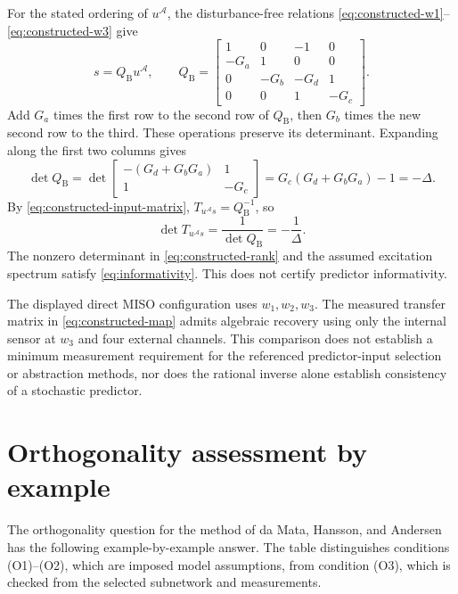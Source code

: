 \documentclass[11pt,a4paper]{article}
\newcommand{\Aset}{\mathcal A}
\begin{document}
For the stated ordering of $u^{\Aset}$, the disturbance-free relations \eqref{eq:constructed-w1}--\eqref{eq:constructed-w3} give
\begin{equation}
  s=Q_{\mathrm B}u^{\Aset},
  \qquad
  Q_{\mathrm B}=\begin{bmatrix}
    1&0&-1&0\\
    -G_a&1&0&0\\
    0&-G_b&-G_d&1\\
    0&0&1&-G_c
  \end{bmatrix}.
  \label{eq:constructed-input-matrix}
\end{equation}
Add $G_a$ times the first row to the second row of $Q_{\mathrm B}$, then $G_b$ times the new second row to the third.  These operations preserve its determinant.  Expanding along the first two columns gives
\[
  \det Q_{\mathrm B}
  =\det\begin{bmatrix}-(G_d+G_bG_a)&1\\1&-G_c\end{bmatrix}
  =G_c(G_d+G_bG_a)-1=-\Delta.
\]
By \eqref{eq:constructed-input-matrix}, $T_{u^{\Aset}s}=Q_{\mathrm B}^{-1}$, so
\begin{equation}
  \det T_{u^{\Aset}s}=\frac{1}{\det Q_{\mathrm B}}=-\frac{1}{\Delta}.
  \label{eq:constructed-rank}
\end{equation}
The nonzero determinant in \eqref{eq:constructed-rank} and the assumed excitation spectrum satisfy \eqref{eq:informativity}.  This does not certify predictor informativity.

The displayed direct MISO configuration uses $w_1,w_2,w_3$.  The measured transfer matrix in \eqref{eq:constructed-map} admits algebraic recovery using only the internal sensor at $w_3$ and four external channels.  This comparison does not establish a minimum measurement requirement for the referenced predictor-input selection or abstraction methods, nor does the rational inverse alone establish consistency of a stochastic predictor.

\section{Orthogonality assessment by example}

The orthogonality question for the method of da Mata, Hansson, and Andersen has the following example-by-example answer.  The table distinguishes conditions (O1)--(O2), which are imposed model assumptions, from condition (O3), which is checked from the selected subnetwork and measurements.
\end{document}
